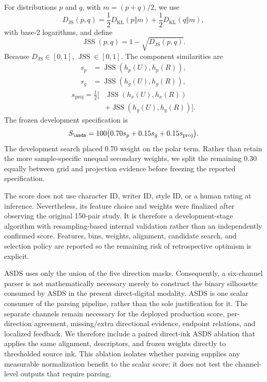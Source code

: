 For distributions \(p\) and \(q\), with \(m=(p+q)/2\), we use
\[
D_{\mathrm{JS}}(p,q)
=\frac{1}{2}D_{\mathrm{KL}}(p\Vert m)
+\frac{1}{2}D_{\mathrm{KL}}(q\Vert m),
\]
with base-2 logarithms, and define
\[
\operatorname{JSS}(p,q)=1-\sqrt{D_{\mathrm{JS}}(p,q)}.
\]
Because \(D_{\mathrm{JS}}\in[0,1]\), \(\operatorname{JSS}\in[0,1]\).
The component similarities are
\[
\begin{aligned}
s_p&=\operatorname{JSS}(h_p(U),h_p(R)),\\
s_g&=\operatorname{JSS}(h_g(U),h_g(R)),
\end{aligned}
\]
\[
\begin{aligned}
s_{\mathrm{proj}}=\frac{1}{2}\bigl[
&\operatorname{JSS}(h_x(U),h_x(R))\\
&+\operatorname{JSS}(h_y(U),h_y(R))
\bigr].
\end{aligned}
\]
The frozen development specification is
\[
S_{\asds}=100\bigl(
0.70s_p+0.15s_g+0.15s_{\mathrm{proj}}
\bigr).
\]
The development search placed 0.70 weight on the polar term. Rather than
retain the more sample-specific unequal secondary weights, we split the
remaining 0.30 equally between grid and projection evidence before freezing
the reported specification.

The score does not use character ID, writer ID, style ID, or a human rating at
inference. Nevertheless, its feature choice and weights were finalized after
observing the original 150-pair study. It is therefore a development-stage
algorithm with resampling-based internal validation rather than an
independently confirmed score. Features, bins, weights, alignment, candidate
search, and selection policy are reported so the remaining risk of
retrospective optimism is explicit.

ASDS uses only the union of the five direction masks. Consequently, a
six-channel parser is not mathematically necessary merely to construct the
binary silhouette consumed by ASDS in the present direct-digital modality.
ASDS is one scalar consumer of the parsing pipeline, rather than the sole
justification for it. The separate channels remain necessary for the deployed
production score, per-direction agreement, missing/extra directional
evidence, endpoint relations, and localized feedback. We therefore include a
paired direct-ink ASDS ablation that applies the same alignment, descriptors,
and frozen weights directly to thresholded source ink. This ablation isolates
whether parsing supplies any measurable normalization benefit to the scalar
score; it does not test the channel-level outputs that require parsing.

